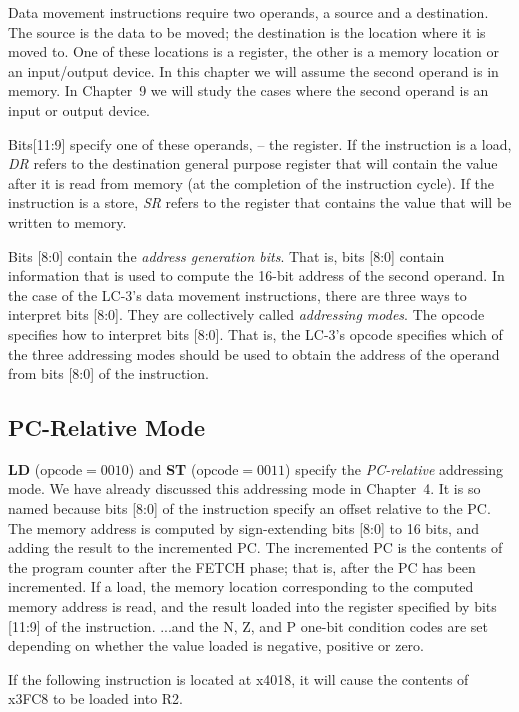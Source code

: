 \documentclass{patt}
\begin{document}
Data movement instructions require two operands, a source and
a destination. The source is the data to be moved; the destination is the
location where it is moved to. One of these locations is a register, the
other is a memory location or an input/output device.
In this chapter we will assume the second operand is in memory.
In Chapter~9 we will study the cases where the second operand is an 
input or output device.

Bits[11:9] specify one of these operands, -- the register.
If the instruction is a load, {\em DR} refers to the destination general 
purpose register that will contain the value after it is read from memory
(at the completion of the instruction cycle).
If the instruction is a store, {\em SR} refers to the register
that contains the value that will be written to memory.

Bits [8:0] contain the {\em address generation bits}. That is, bits [8:0] 
contain information that is used to compute the 16-bit address of
the second operand. In the case of the LC-3's data movement instructions,
there are three ways to interpret bits [8:0]. They are collectively called
{\em addressing modes}. The opcode specifies how to interpret
bits [8:0]. That is, the LC-3's opcode specifies which of the three addressing 
modes should be used to obtain the address of the operand from bits [8:0] of 
the instruction.

\subsection{PC-Relative Mode}

{\bf LD} ($\text{opcode}=0010$) and {\bf ST} ($\text{opcode}=0011$) specify 
the {\em PC-relative} addressing mode.
We have already discussed this addressing mode in Chapter~4.  It is so named 
because bits [8:0] of the instruction
specify an offset relative to the PC. The memory address is computed by
sign-extending bits [8:0] to 16 bits, and adding the result to the
incremented PC. The incremented PC is the contents of the program counter
after the FETCH phase; that is, after the PC has been incremented.
If a load, the memory location corresponding to the computed memory address 
is read, and the result loaded into the register
specified by bits [11:9] of the instruction.  ...and the N, Z, and P one-bit
condition codes are set depending on whether the value loaded is negative,
positive or zero.

If the following instruction is located at x4018, it will cause the contents 
of x3FC8 to be loaded into R2.
\end{document}
